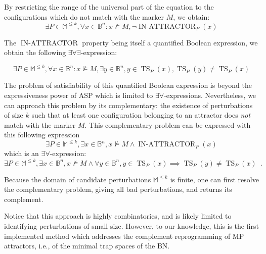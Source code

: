 \documentclass[PCJ,Unicode,screen,mode=plain]{cedram}
\begin{document}
By restricting the range of the universal part of the equation to the
configurations which do not match with the marker \(M\), we obtain:
\begin{equation}
    \exists P\in\mathbb M^{\leq k}, \forall x\in\mathbb B^n: x\not\models M, \neg\operatorname{IN-ATTRACTOR}_P(x)
\end{equation}

The \(\operatorname{IN-ATTRACTOR}\) property being itself a quantified
Boolean expression, we obtain the following
\(\exists\forall\exists\)-expression:

\begin{equation}
    \exists P\in\mathbb M^{\leq k}, \forall x\in\mathbb B^n: x\not\models M, \exists y\in\mathbb B^n,
   y\in \operatorname{TS}_P(x), \operatorname{TS}_P(y) \neq \operatorname{TS}_P(x)
\end{equation}

The problem of satisfiability of this quantified Boolean expression is
beyond the expressiveness power of ASP which is limited to
\(\exists\forall\)-expressions. Nevertheless, we can approach this
problem by its complementary: the existence of perturbations of size
\(k\) such that at least one configuration belonging to an attractor
does \emph{not} match with the marker \(M\). This complementary problem
can be expressed with this following expression \begin{equation}
    \exists P\in\mathbb M^{\leq k}, \exists x\in\mathbb B^n,x\not\models M \wedge \operatorname{IN-ATTRACTOR}_P(x)
\end{equation} which is an \(\exists\forall\)-expression:
\begin{equation}
    \exists P\in\mathbb M^{\leq k}, \exists x\in\mathbb B^n, x\not\models M\wedge \forall y\in\mathbb B^n, y\in \operatorname{TS}_P(x) \implies \operatorname{TS}_P(y) \neq \operatorname{TS}_P(x)
\enspace.
\end{equation}

Because the domain of candidate perturbations \(\mathbb M^{\leq k}\) is
finite, one can first resolve the complementary problem, giving all bad
perturbations, and returns its complement.

Notice that this approach is highly combinatorics, and is likely limited
to identifying perturbations of small size. However, to our knowledge,
this is the first implemented method which addresses the complement
reprogramming of MP attractors, i.e., of the minimal trap spaces of the
BN.
\end{document}
